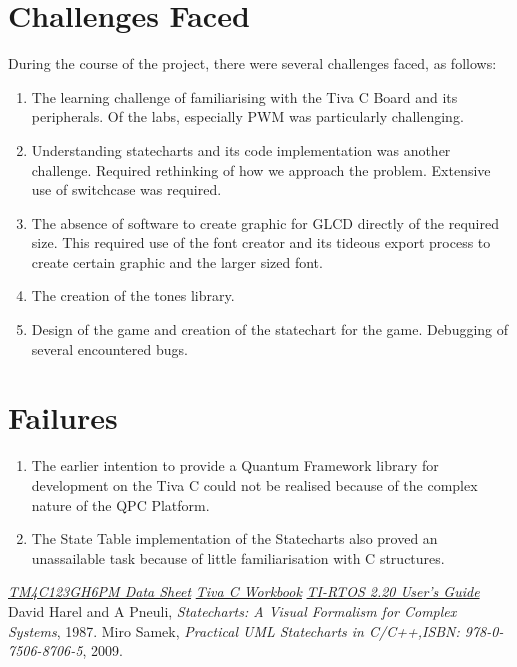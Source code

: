 \documentclass[a4paper,12pt,oneside]{book}
\begin{document}
\section{Challenges Faced}
\qquad During the course of the project, there were several challenges faced, as follows:
\begin{enumerate}
\item The learning challenge of familiarising with the Tiva C Board and its peripherals. Of the labs, especially PWM was particularly challenging.
\item Understanding statecharts and its code implementation was another challenge. Required rethinking of how we approach the problem. Extensive use of switchcase was required.
\item The absence of software to create graphic for GLCD directly of the required size. This required use of the font creator and its tideous export process to create certain graphic and the larger sized font.
\item The creation of the tones library.
\item Design of the game and creation of the statechart for the game. Debugging of several encountered bugs.
\end{enumerate}
\section{Failures}
\begin{enumerate}
\item The earlier intention to provide a Quantum Framework library for development on the Tiva C could not be realised because of the complex nature of the QPC Platform.
\item The State Table implementation of the Statecharts also proved an unassailable task because of little familiarisation with C structures.
\end{enumerate}
\begin{thebibliography}{li}
{\em \href{http://www.ti.com/lit/ds/spms376e/spms376e.pdf}{TM4C123GH6PM Data Sheet}}
{\em \href{http://software-dl.ti.com/trainingTTO/trainingTTO_public_sw/GSW-TM4C123G-LaunchPad/TM4C123G_LaunchPad_Workshop_Workbook.pdf}{Tiva C Workbook}}
{\em \href{http://www.ti.com/lit/ug/spruhd4m/spruhd4m.pdf}{TI-RTOS 2.20 User's Guide}}
David Harel and A Pneuli,
{\em Statecharts: A Visual Formalism for Complex Systems},
1987.
Miro Samek,
{\em Practical UML Statecharts in C/C++,ISBN: 978-0-7506-8706-5},
2009.
\end{thebibliography}
\end{document}
